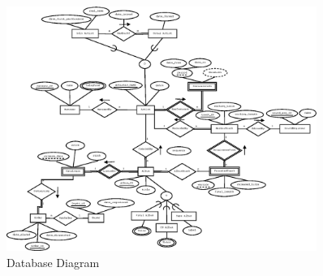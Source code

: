 \documentclass[11pt,a4paper]{article}
\begin{document}
\begin{figure}[!htbp]      
   	\centering
	\centerline{\includegraphics[width=0.9\textwidth]{diagrams/OrinocoInitial.eps}}
	\caption{Database Diagram}
	\label{fig:test-figure}
\end{figure}
\end{document}
